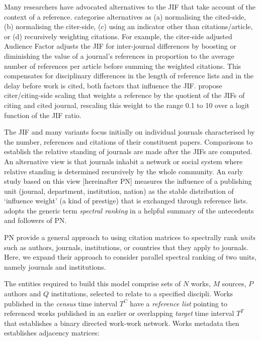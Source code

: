 \documentclass[10pt]{article}
\begin{document}
Many researchers have advocated alternatives to the JIF that take account of the context of a reference. \cite{waltmanRelationEigenfactorAudience2010} categorise alternatives as (a) normalising the cited-side, (b) normalising the citer-side, (c) using an indicator other than citations/article, or (d) recursively weighting citations. For example, the citer-side adjusted Audience Factor \citep{zitt2008} adjusts the JIF for inter-journal differences by boosting or diminishing the value of a journal's references in proportion to the average number of references per article before summing the weighted citations. This compensates for disciplinary differences in the length of reference lists and in the delay before work is cited, both factors that influence the JIF. \cite{habibzadehJournalWeightedImpact2008} propose citer/citing-side scaling that weights a reference by the quotient of the JIFs of citing and cited journal, rescaling this weight to the range 0.1 to 10 over a logit function of the JIF ratio. 

The JIF and many variants focus initially on individual journals characterised by the number, references and citations of their constituent papers. Comparisons to establish the relative standing of journals are made after the JIFs are computed. An alternative view is that journals inhabit a network or social system where relative standing is determined recursively by the whole community. An early study based on this view \citep{narinEVALUATIVEBIBLIOMETRICSUSE1976, pinski, narinStructureBiomedicalLiterature1976} [hereinafter PN] measures the influence of a publishing unit (journal, department, institution, nation) as the stable distribution of `influence weight' (a kind of prestige) that is exchanged through reference lists. \cite{vignaSpectralRanking2016} adopts the generic term \textit{spectral ranking} in a helpful summary of the antecedents and followers of PN.

PN provide a general approach to using citation matrices to spectrally rank \textit{units} such as authors, journals, institutions, or countries that they apply to journals. Here, we expand their approach to consider parallel spectral ranking of two units, namely journals and institutions.

The entities required to build this model comprise sets of $N$ works, $M$ sources, $P$ authors and $Q$ institutions, selected to relate to a specified discipli. Works published in the \textit{census} time interval $T^C$ have a \textit{reference list} pointing to referenced works published in an earlier or overlapping \textit{target} time interval $T^T$ that establishes a binary directed work-work network. Works metadata then establishes adjacency matrices: 
\end{document}
